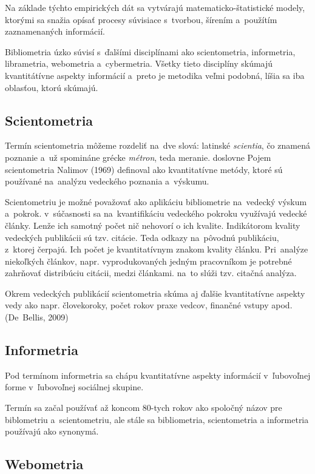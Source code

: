 Na základe týchto empirických dát sa vytvárajú matematicko-štatistické modely,
ktorými sa snažia opísať procesy súvisiace s~tvorbou, šírením a~použítím
zaznamenaných informácií. 

Bibliometria úzko súvisí s~ďalšími disciplínami ako scientometria, informetria,
librametria, webometria a~cybermetria. Všetky tieto disciplíny skúmajú
kvantitátívne aspekty informácií a~preto je metodika veľmi podobná, líšia sa iba
oblasťou, ktorú skúmajú.


\subsection{Scientometria}

Termín scientometria môžeme rozdeliť na~dve slová: latinské {\em scientia}, čo znamená
poznanie a~už spomináne grécke {\em métron}, teda meranie. doslovne  Pojem scientometria Nalimov (1969) definoval ako kvantitatívne
metódy, ktoré sú používané na~analýzu vedeckého poznania a~výskumu. 

Scientometriu je možné považovať ako aplikáciu bibliometrie na~vedecký výskum
a~pokrok. v~súčasnosti sa na~kvantifikáciu vedeckého pokroku využívajú vedecké
články. Lenže ich samotný počet nič nehovorí o ich kvalite. Indikátorom kvality
vedeckých publikácii sú tzv. citácie. Teda odkazy na~pôvodnú publikáciu,
z~ktorej čerpajú. Ich počet je kvantitatívnym znakom kvality článku.
Pri~analýze niekoľkých článkov, napr. vyprodukovaných jedným pracovníkom je
potrebné zahrňovať distribúciu citácii, medzi článkami. na~to slúži tzv. citačná
analýza.

Okrem vedeckých publikácií scientometria skúma aj ďalšie kvantitatívne aspekty
vedy ako napr. človekoroky, počet rokov praxe vedcov, finančné vstupy
apod. (De~Bellis, 2009)


\subsection{Informetria}

Pod termínom informetria sa chápu kvantitatívne aspekty informácií v~ľubovoľnej
forme v~ľubovoľnej sociálnej skupine.

Termín sa začal používať až koncom 80-tych rokov ako spoločný názov pre
biblometriu a~scientometriu, ale stále sa bibliometria, scientometria a
informetria používajú ako synonymá.


\subsection{Webometria}

